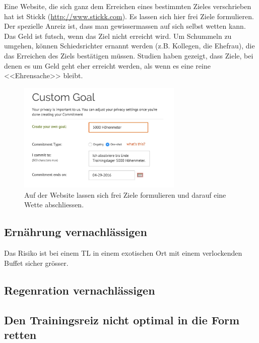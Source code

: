 \documentclass[a4paper,DIV13,BCOR0cm]{scrartcl}
\begin{document}
Eine Website, die sich ganz dem Erreichen eines bestimmten Zieles verschrieben hat ist Stickk (\url{http://www.stickk.com}).
Es lassen sich hier frei Ziele formulieren.
Der spezielle Anreiz ist, dass man gewissermassen auf sich selbst wetten kann.
Das Geld ist futsch, wenn das Ziel nicht erreicht wird.
Um Schummeln zu umgehen, können Schiedsrichter ernannt werden (z.B. Kollegen, die Ehefrau), die das Erreichen des Ziels bestätigen müssen.
Studien haben gezeigt, dass Ziele, bei denen es um Geld geht eher erreicht werden, als wenn es eine reine <<Ehrensache>> bleibt.

\begin{figure}[htpb]
  \centering
  \includegraphics[width=0.7\textwidth]{figs/stickkcom.jpg}
  \caption{Auf der Website lassen sich frei Ziele formulieren und darauf eine Wette abschliessen.}
  \label{fig:stickkcom}
\end{figure}


\subsection{Ernährung vernachlässigen}

Das Risiko ist bei einem TL in einem exotischen Ort mit einem verlockenden Buffet sicher grösser.

\subsection{Regenration vernachlässigen}

\subsection{Den Trainingsreiz nicht optimal in die Form retten}



% 

\end{document}
